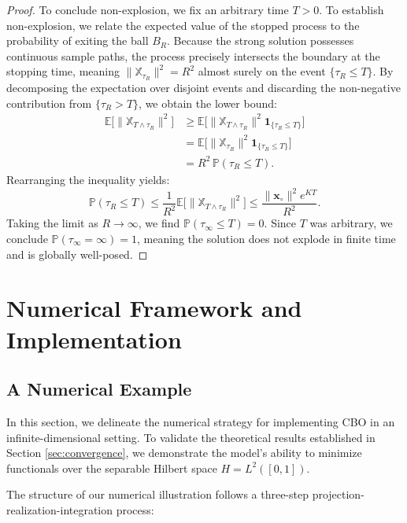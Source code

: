 \documentclass[12pt]{amsart}
\numberwithin{equation}{section}
\begin{document}
\begin{proof}
To conclude non-explosion, we fix an arbitrary time $T > 0$. 
To establish non-explosion, we relate the expected value of the stopped process to the probability of exiting the ball $B_R$. Because the strong solution possesses continuous sample paths, the process precisely intersects the boundary at the stopping time, meaning $\|\mathds{X}_{\tau_R}\|^2 = R^2$ almost surely on the event $\{\tau_R \leq T\}$. By decomposing the expectation over disjoint events and discarding the non-negative contribution from $\{\tau_R > T\}$, we obtain the lower bound:
\begin{align*}
    \mathbb{E}\big[\|\mathds{X}_{T \wedge \tau_R}\|^2\big] &\geq \mathbb{E}\Big[\|\mathds{X}_{T \wedge \tau_R}\|^2 \mathbf{1}_{\{\tau_R \leq T\}}\Big] \\
    &= \mathbb{E}\Big[\|\mathds{X}_{\tau_R}\|^2 \mathbf{1}_{\{\tau_R \leq T\}}\Big] \\
    &= R^2 \, \mathbb{P}(\tau_R \leq T).
\end{align*}
Rearranging the inequality yields:
\begin{equation*}
     \mathbb{P}(\tau_R \leq T) \leq \frac{1}{R^{2}} \mathbb{E}\big[\|\mathds{X}_{T \wedge \tau_{R}}\|^{2}\big]\leq \frac{\|\mathbf{x}_{\circ}\|^{2} e^{KT}}{R^{2}}.
\end{equation*}
Taking the limit as $R \to \infty$, we find $\mathbb{P}(\tau_{\infty} \leq T) = 0$. Since $T$ was arbitrary, we conclude $\mathbb{P}(\tau_{\infty} = \infty) = 1$, meaning the solution does not explode in finite time and is globally well-posed.
\end{proof}




\section{Numerical Framework and Implementation}
\label{sec:numerics}

\subsection{A Numerical Example}

In this section, we delineate the numerical strategy for implementing CBO in an infinite-dimensional setting. To validate the theoretical results established in Section \ref{sec:convergence}, we demonstrate the model's ability to minimize functionals over the separable Hilbert space $H = L^2([0, 1])$.

The structure of our numerical illustration follows a three-step projection-realization-integration process:
\end{document}
